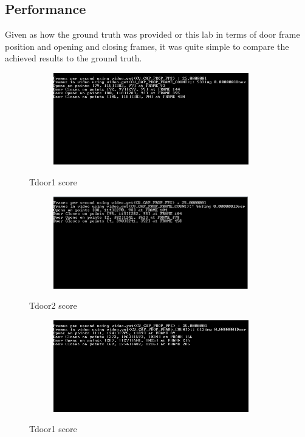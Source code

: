 \documentclass{article}
\begin{document}
\subsection{Performance}\label{sec:intro}
Given as how the ground truth was provided or this lab in terms of door frame position and opening and closing frames, it was quite simple to compare the achieved results to the ground truth. \\





\begin{figure}[H]
\center
\begin{subfigure}{0.5\textwidth}
\includegraphics[width=0.9\linewidth, height=4cm]{door1_score.PNG} 
\caption{}
\label{fig:subim2}
\end{subfigure}
\caption{Tdoor1 score}
\label{fig:image2}
\end{figure}


\begin{figure}[H]
	\center
	\begin{subfigure}{0.5\textwidth}
		\includegraphics[width=0.9\linewidth, height=4cm]{Door2_score.PNG} 
		\caption{}
		\label{fig:subim2}
	\end{subfigure}
	\caption{Tdoor2 score}
	\label{fig:image2}
\end{figure}


\begin{figure}[H]
	\center
	\begin{subfigure}{0.5\textwidth}
		\includegraphics[width=0.9\linewidth, height=4cm]{door3_score.PNG} 
		\caption{}
		\label{fig:subim2}
	\end{subfigure}
	\caption{Tdoor1 score}
	\label{fig:image2}
\end{figure}
\end{document}
